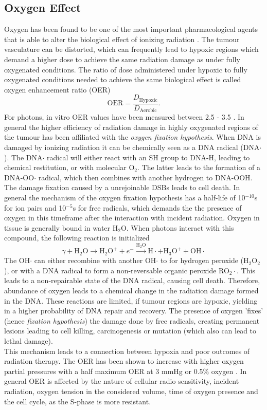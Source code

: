 \subsection{Oxygen Effect}
Oxygen has been found to be one of the most important pharmacological agents that is able to alter the biological effect of ionizing radiation \cite{petry, mottram, pmid13106296}. The tumour vasculature can be distorted, which can frequently lead to hypoxic regions which demand a higher dose to achieve the same radiation damage as under fully oxygenated conditions. The ratio of dose administered under hypoxic to fully oxygenated conditions needed to achieve the same biological effect is called oxygen enhancement ratio (OER)
\begin{equation} 
\mathrm{OER} = \frac{D_{\mathrm{Hypoxic}}}{D_{\mathrm{Aerobic}}}.
\end{equation} 
For photons, in vitro OER values have been measured between 2.5 - 3.5 \cite{Hall}. In general the higher efficiency of radiation damage in highly oxygenated regions of the tumour has been affiliated with the \textit{oxygen fixation hypothesis}. When DNA is damaged by ionizing radiation it can be chemically seen as a DNA radical (DNA$\cdot$). The DNA$\cdot$ radical will either react with an SH group to DNA-H, leading to chemical restitution, or with molecular O$_2$. The latter leads to the formation of a DNA-OO$\cdot$ radical, which then combines with another hydrogen to DNA-OOH. The damage fixation caused by a unrejoinable DSBs leads to cell death. In general the mechanism of the oxygen fixation hypothesis has a half-life of 10$^{-10}$s for ion pairs and 10$^{-5}$s for free radicals, which demands the the presence of oxygen in this timeframe after the interaction with incident radiation. Oxygen in tissue is generally bound in water H$_2$O. When photons interact with this compound, the following reaction is initialized
\begin{equation}
\gamma + \mathrm{H}_2\mathrm{O}\rightarrow \mathrm{H}_2\mathrm{O}^+ + e^- \xrightarrow{\mathrm{H}_2\mathrm{O}} \mathrm{H}\cdot +\mathrm{H}_3\mathrm{O}^++\mathrm{OH}\cdot
\end{equation}
The OH$\cdot$ can either recombine with another OH$\cdot$ to for hydrogen peroxide (H$_2$O$_2$), or with a DNA radical to form a non-reversable organic peroxide RO$_2\cdot$. This leads to a non-repairable state of the DNA radical, causing cell death. Therefore, abundance of oxygen leads to a chemical change in the radiation damage formed in the DNA. These reactions are limited, if tumour regions are hypoxic, yielding in a higher probability of DNA repair and recovery. The presence of oxygen 'fixes' (hence \textit{fixation hypothesis}) the damage done by free radicals, creating permanent lesions leading to cell killing, carcinogenesis or mutation (which also can lead to lethal damage).\\This mechanism leads to a connection between hypoxia and poor outcomes of radiation therapy. The OER has been shown to increase with higher oxygen partial pressures with a half maximum OER at 3 mmHg or 0.5\% oxygen \cite{ pmid15183486}. In general OER is affected by the nature of cellular radio sensitivity, incident radiation, oxygen tension in the considered volume, time of oxygen presence and the cell cycle, as the S-phase is more resistant.
